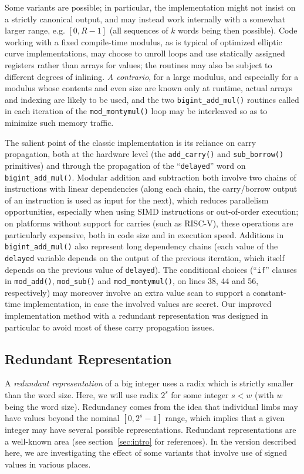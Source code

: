 \documentclass{llncs}
\begin{document}
Some variants are possible; in particular, the implementation might not
insist on a strictly canonical output, and may instead work internally
with a somewhat larger range, e.g. $[0, R-1]$ (all sequences of $k$
words being then possible). Code working with a fixed compile-time
modulus, as is typical of optimized elliptic curve implementations, may
choose to unroll loops and use statically assigned registers rather than
arrays for values; the routines may also be subject to different degrees
of inlining. \emph{A contrario}, for a large modulus, and especially for
a modulus whose contents and even size are known only at runtime, actual
arrays and indexing are likely to be used, and the two
\verb+bigint_add_mul()+ routines called in each iteration of the
\verb+mod_montymul()+ loop may be interleaved so as to minimize such
memory traffic.

The salient point of the classic implementation is its reliance on carry
propagation, both at the hardware level (the \verb+add_carry()+ and
\verb+sub_borrow()+ primitives) and through the propagation of the
``\verb+delayed+'' word on \verb+bigint_add_mul()+. Modular addition and
subtraction both involve two chains of instructions with linear
dependencies (along each chain, the carry/borrow output of an
instruction is used as input for the next), which reduces parallelism
opportunities, especially when using SIMD instructions or out-of-order
execution; on platforms without support for carries (such as RISC-V),
these operations are particularly expensive, both in code size and in
execution speed. Additions in \verb+bigint_add_mul()+ also represent
long dependency chains (each value of the \verb+delayed+ variable
depends on the output of the previous iteration, which itself depends on
the previous value of \verb+delayed+). The conditional choices
(``\verb+if+'' clauses in \verb+mod_add()+, \verb+mod_sub()+ and
\verb+mod_montymul()+, on lines 38, 44 and 56, respectively) may
moreover involve an extra value scan to support a constant-time
implementation, in case the involved values are secret. Our improved
implementation method with a redundant representation was designed in
particular to avoid most of these carry propagation issues.

\subsection{Redundant Representation}\label{sec:montymul:redundant}

A \emph{redundant representation} of a big integer uses a radix which is
strictly smaller than the word size. Here, we will use radix $2^s$ for
some integer $s < w$ (with $w$ being the word size). Redundancy comes
from the idea that individual limbs may have values beyond the nominal
$[0, 2^s - 1]$ range, which implies that a given integer may have
several possible representations. Redundant representations are a
well-known area (see section~\ref{sec:intro} for references). In the
version described here, we are investigating the effect of some variants
that involve use of signed values in various places.
\end{document}
